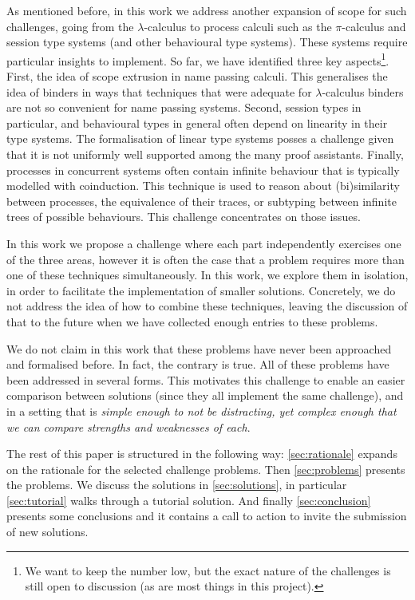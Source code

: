\documentclass{article}
\begin{document}
As mentioned before, in this work we address another expansion of
scope for such challenges, going from the $\lambda$-calculus to
process calculi such as the $\pi$-calculus and session type systems
(and other behavioural type systems). These systems require particular
insights to implement. So far, we have identified three key
aspects\footnote{We want to keep the number low, but the exact nature
  of the challenges is still open to discussion (as are most things in
  this project).}. First, the idea of scope extrusion in name passing
calculi. This generalises the idea of binders in ways that techniques
that were adequate for $\lambda$-calculus binders are not so
convenient for name passing systems. Second, session types in
particular, and behavioural types in general often depend on linearity
in their type systems. The formalisation of linear type systems posses
a challenge given that it is not uniformly well supported among the
many proof assistants. Finally, processes in concurrent systems often
contain infinite behaviour that is typically modelled with
coinduction. This technique is used to reason about (bi)similarity
between processes, the equivalence of their traces, or subtyping
between infinite trees of possible behaviours. This challenge
concentrates on those issues.

In this work we propose a challenge where each part independently
exercises one of the three areas, however it is often the case that a
problem requires more than one of these techniques simultaneously. In
this work, we explore them in isolation, in order to facilitate the
implementation of smaller solutions. Concretely, we do not address the
idea of how to combine these techniques, leaving the discussion of
that to the future when we have collected enough entries to these
problems.

We do not claim in this work that these problems have never been
approached and formalised before. In fact, the contrary is true. All
of these problems have been addressed in several forms. This motivates
this challenge to enable an easier comparison between solutions (since
they all implement the same challenge), and in a setting that is
\emph{simple enough to not be distracting, yet complex enough that we can
compare strengths and weaknesses of each}.

The rest of this paper is structured in the following way:
\cref{sec:rationale} expands on the rationale for the selected
challenge problems. Then \cref{sec:problems} presents the problems. We
discuss the solutions in \cref{sec:solutions}, in particular
\cref{sec:tutorial} walks through a tutorial solution. And finally
\cref{sec:conclusion} presents some conclusions and it contains a call
to action to invite the submission of new solutions.
\end{document}
